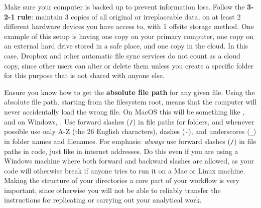 Make sure your computer is backed up to prevent information loss.
Follow the \textbf{3-2-1 rule}: maintain 3 copies of all original or irreplaceable data,
on at least 2 different hardware devices you have access to,
with 1 offsite storage method.
One example of this setup is having one copy on your primary computer,
one copy on an external hard drive stored in a safe place,
and one copy in the cloud.
In this case, Dropbox and other automatic file sync services do not count as a cloud copy,
since other users can alter or delete them
unless you create a specific folder for this purpose that is not shared with anyone else.

Ensure you know how to get the \textbf{absolute file path} for any given file.
Using the absolute file path, starting from the filesystem root,
means that the computer will never accidentally load the wrong file.
On MacOS this will be something like ,
and on Windows, .
Use forward slashes (\texttt{/}) in file paths for folders,
and whenever possible use only A-Z (the 26 English characters),
dashes (\texttt{-}), and underscores (\texttt{\_}) in folder names and filenames.
For emphasis: \textit{always} use forward slashes (\texttt{/}) in file paths in code,
just like in internet addresses. Do this even if you are using a Windows machine where
both forward and backward slashes are allowed, as your code will otherwise break
if anyone tries to run it on a Mac or Linux machine.
Making the structure of your directories a core part of your workflow is very important,
since otherwise you will not be able to reliably transfer the instructions
for replicating or carrying out your analytical work.

